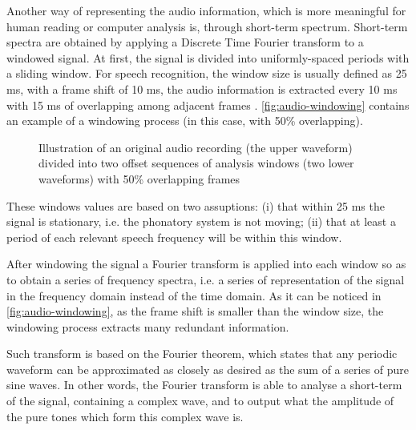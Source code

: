 Another way of representing the audio information, which is more meaningful for human reading
or computer analysis is, through short-term spectrum. Short-term spectra are obtained by applying
a Discrete Time Fourier transform to a windowed signal. At first, the signal is divided
into uniformly-spaced periods with a sliding window. For speech recognition, the window size is usually defined as 25 ms, 
with a frame shift of 10 ms, the audio information is extracted every 10 ms with 15 ms of overlapping
among adjacent frames \cite{Huang2001}. \autoref{fig:audio-windowing} contains an example of a windowing process (in this case, 
with 50\% overlapping).

\begin{figure}[!ht]
        \noindent{}
        \caption{Illustration of an original audio recording (the upper waveform) divided into two
offset sequences of analysis windows (two lower waveforms) with 50\% overlapping frames \cite{McLoughlin2009}}
        \label{fig:audio-windowing}
\end{figure}

These windows values are based on two assuptions: (i) that within 25 ms the signal is stationary, i.e.
the phonatory system is not moving; (ii) that at least a period of each relevant speech frequency will 
be within this window.

After windowing the signal a Fourier transform is applied into each window so as to obtain
a series of frequency spectra, i.e. a series of representation of the signal in the frequency domain instead of the time domain. As it can be noticed in \autoref{fig:audio-windowing}, as the frame shift is smaller than the window size, the windowing process extracts many redundant information. 

Such transform is based on the Fourier theorem, which states that any periodic waveform can be approximated as closely as desired as the sum of a series of pure sine waves. In other words, the Fourier transform is able to analyse a short-term of the signal, containing a complex wave, and to output what the amplitude of the pure tones which form this complex wave is.

